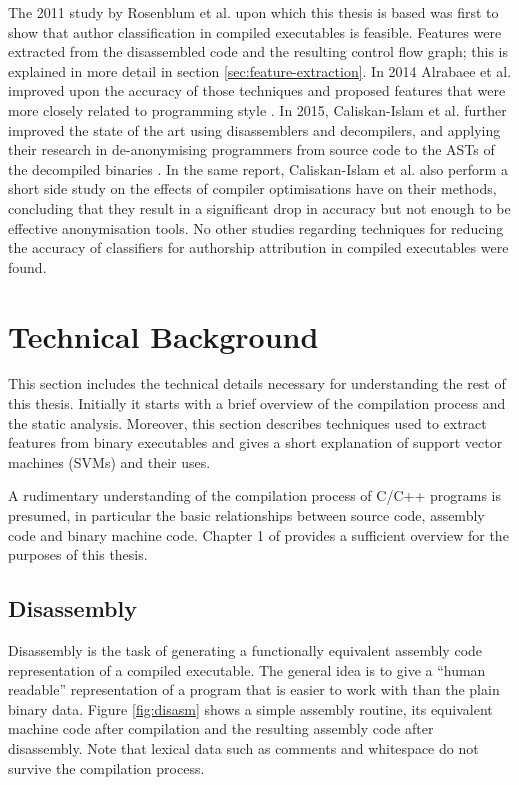 \documentclass[a4paper,11pt]{kth-mag}
\begin{document}
The 2011 study by Rosenblum et al. \parencite{rosenblum2011wrote} upon which this
thesis is based was first to show that author classification in compiled
executables is feasible. Features were extracted from the disassembled code and
the resulting control flow graph; this is explained in more detail in section
\ref{sec:feature-extraction}. In 2014 Alrabaee et al. improved upon the
accuracy of those techniques and proposed features that were more closely
related to programming style \parencite{alrabaee2014oba2}. In 2015,
Caliskan-Islam et al. further improved the state of the art using disassemblers
and decompilers, and applying their research in de-anonymising programmers from
source code to the ASTs of the decompiled binaries
\parencite{caliskan2015coding}. In the same report, Caliskan-Islam et al. also
perform a short side study on the effects of compiler optimisations have on
their methods, concluding that they result in a significant drop in accuracy
but not enough to be effective anonymisation tools. No other studies regarding
techniques for reducing the accuracy of classifiers for authorship attribution
in compiled executables were found.

\section{Technical Background}
This section includes the technical details necessary for understanding the
rest of this thesis. Initially it starts with a brief overview of the
compilation process and the static analysis. Moreover, this section describes
techniques used to extract features from binary executables and gives a short
explanation of support vector machines (SVMs) and their uses. 

A rudimentary understanding of the compilation process of C/C++ programs is
presumed, in particular the basic relationships between source code, assembly
code and binary machine code. Chapter 1 of \parencite{aho1986compilers}
provides a sufficient overview for the purposes of this thesis.

\subsection{Disassembly}
Disassembly is the task of generating a functionally equivalent assembly code
representation of a compiled executable. The general idea is to give a ``human
readable'' representation of a program that is easier to work with than the plain
binary data. Figure \ref{fig:disasm} shows a simple assembly routine, its
equivalent machine code after compilation and the resulting assembly code after
disassembly. Note that lexical data such as comments and whitespace do not
survive the compilation process.
\end{document}
